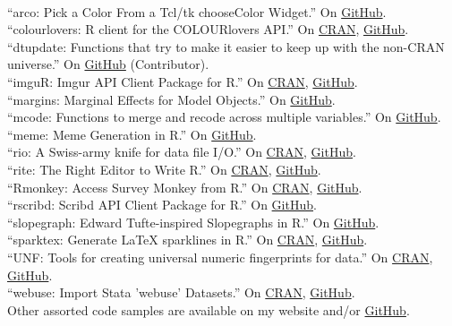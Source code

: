\documentclass[12pt]{article}
\renewcommand{\section}[1]{\pagebreak[3]%
    \llap{\scshape\smash{\parbox[t]{\marginparwidth}{\raggedright {\color{lg}#1}}}}%
    \vspace{-\baselineskip}\par}
\newcommand{\topic}[1]{\pagebreak[3]\indent {\color{lg}{\footnotesize #1 }}\\}
\newcommand{\entry}[1]{\indent {\color{lg}\guillemotright}\hspace{2pt}#1\vspace{.25em}\\}
\begin{document}
\section{Software}
\topic{R Packages}
\entry{``arco: Pick a Color From a Tcl/tk chooseColor Widget.'' On \href{https://github.com/leeper/arco}{GitHub}.}
\entry{``colourlovers: R client for the COLOURlovers API.'' On \href{https://cran.r-project.org/package=colourlovers}{CRAN}, \href{https://github.com/leeper/colourloers}{GitHub}.}
\entry{``dtupdate: Functions that try to make it easier to keep up with the non-CRAN universe.'' On \href{https://github.com/hrbrmstr/dtupdate}{GitHub} (Contributor).}
\entry{``imguR: Imgur API Client Package for R.'' On \href{https://cran.r-project.org/package=imguR}{CRAN}, \href{https://github.com/leeper/imguR}{GitHub}.}
\entry{``margins: Marginal Effects for Model Objects.'' On \href{https://github.com/leeper/margins}{GitHub}.}
\entry{``mcode: Functions to merge and recode across multiple variables.'' On \href{https://github.com/leeper/mcode}{GitHub}.}
\entry{``meme: Meme Generation in R.'' On \href{https://github.com/leeper/meme}{GitHub}.}
\entry{``rio: A Swiss-army knife for data file I/O.'' On \href{https://cran.r-project.org/package=rio}{CRAN}, \href{https://github.com/leeper/rio}{GitHub}.}
\entry{``rite: The Right Editor to Write R.'' On \href{https://cran.r-project.org/package=rite}{CRAN}, \href{https://github.com/leeper/rio}{GitHub}.}
\entry{``Rmonkey: Access Survey Monkey from R.'' On \href{https://cran.r-project.org/package=Rmonkey}{CRAN}, \href{https://github.com/leeper/Rmonkey}{GitHub}.}
\entry{``rscribd: Scribd API Client Package for R.'' On \href{https://github.com/leeper/rscribd}{GitHub}.}
\entry{``slopegraph: Edward Tufte-inspired Slopegraphs in R.'' On \href{https://github.com/leeper/slopegraph}{GitHub}.}
\entry{``sparktex: Generate LaTeX sparklines in R.'' On \href{https://cran.r-project.org/package=sparktex}{CRAN}, \href{https://github.com/leeper/sparktex}{GitHub}.}
\entry{``UNF: Tools for creating universal numeric fingerprints for data.'' On \href{https://cran.r-project.org/package=UNF}{CRAN}, \href{https://github.com/leeper/UNF}{GitHub}.}
\entry{``webuse: Import Stata 'webuse' Datasets.'' On \href{https://cran.r-project.org/package=webuse}{CRAN}, \href{https://github.com/leeper/webuse}{GitHub}.}
\entry{Other assorted code samples are available on my website and/or \href{http://github.com/leeper}{GitHub}.}
\end{document}
